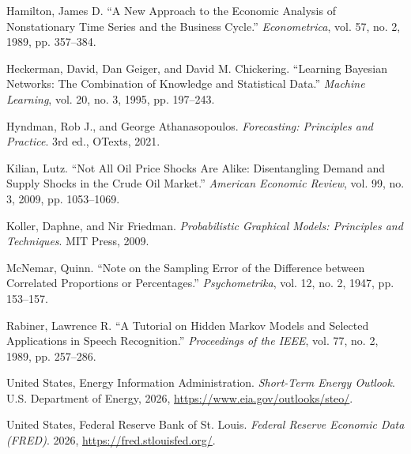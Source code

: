 \documentclass[11pt,a4paper]{article}
\begin{document}
\vspace{0.6em}\noindent
Hamilton, James D. ``A New Approach to the Economic Analysis of Nonstationary Time Series and the
Business Cycle.'' \textit{Econometrica}, vol. 57, no. 2, 1989, pp. 357--384.

\vspace{0.6em}\noindent
Heckerman, David, Dan Geiger, and David M. Chickering. ``Learning Bayesian Networks: The
Combination of Knowledge and Statistical Data.'' \textit{Machine Learning}, vol. 20, no. 3, 1995,
pp. 197--243.

\vspace{0.6em}\noindent
Hyndman, Rob J., and George Athanasopoulos. \textit{Forecasting: Principles and Practice}. 3rd ed.,
OTexts, 2021.

\vspace{0.6em}\noindent
Kilian, Lutz. ``Not All Oil Price Shocks Are Alike: Disentangling Demand and Supply Shocks in the
Crude Oil Market.'' \textit{American Economic Review}, vol. 99, no. 3, 2009, pp. 1053--1069.

\vspace{0.6em}\noindent
Koller, Daphne, and Nir Friedman. \textit{Probabilistic Graphical Models: Principles and
Techniques}. MIT Press, 2009.

\vspace{0.6em}\noindent
McNemar, Quinn. ``Note on the Sampling Error of the Difference between Correlated Proportions or
Percentages.'' \textit{Psychometrika}, vol. 12, no. 2, 1947, pp. 153--157.

\vspace{0.6em}\noindent
Rabiner, Lawrence R. ``A Tutorial on Hidden Markov Models and Selected Applications in Speech
Recognition.'' \textit{Proceedings of the IEEE}, vol. 77, no. 2, 1989, pp. 257--286.

\vspace{0.6em}\noindent
United States, Energy Information Administration. \textit{Short-Term Energy Outlook}. U.S.
Department of Energy, 2026, \url{https://www.eia.gov/outlooks/steo/}.

\vspace{0.6em}\noindent
United States, Federal Reserve Bank of St. Louis. \textit{Federal Reserve Economic Data (FRED)}.
2026, \url{https://fred.stlouisfed.org/}.
\end{document}
